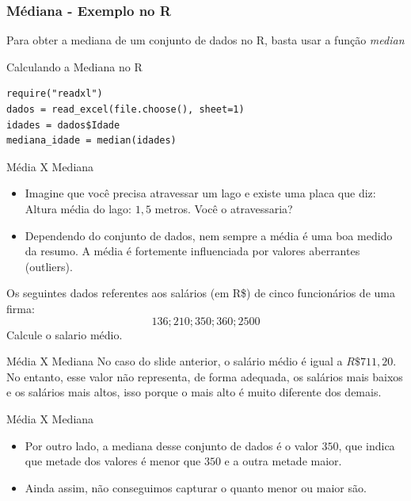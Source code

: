 \begin{frame}[fragile]
\frametitle{Médiana - Exemplo no R}   
Para obter a mediana de um conjunto de dados no R, basta usar a função \textit{median}
\begin{block}{Calculando a Mediana no R}
\begin{verbatim}
require("readxl")
dados = read_excel(file.choose(), sheet=1) 
idades = dados$Idade
mediana_idade = median(idades)
\end{verbatim}
\end{block}
\end{frame}

\begin{frame}{Média X Mediana}

\begin{itemize}
    \item Imagine que você precisa atravessar um lago e existe uma placa que diz: Altura média do lago: $1,5$ metros. Você o atravessaria?
    \pause
    \item Dependendo do conjunto de dados, nem sempre a média é uma boa medido da resumo. A média é fortemente influenciada por valores aberrantes (outliers). 
\end{itemize}

\pause

\begin{exemplo}
    Os seguintes dados referentes aos salários (em R\$) de cinco funcionários de uma firma: $$136; 210; 350; 360; 2500$$ Calcule o salario médio. 
\end{exemplo}

\end{frame}

\begin{frame}{Média X Mediana}
    No caso do slide anterior, o salário médio é igual a $R\$ 711,20$. No entanto, esse valor não representa, de forma adequada, os salários mais
    baixos e os salários mais altos, isso porque o mais alto é muito diferente dos demais.
     
\end{frame}

\begin{frame}{Média X Mediana}
    \begin{itemize}
        \item Por outro lado, a mediana desse conjunto de dados é o valor $350$, que indica que metade dos valores é menor que $350$ e a outra metade maior. 
        \item Ainda assim, não conseguimos capturar o quanto menor ou maior são. 
    \end{itemize}
\end{frame}

